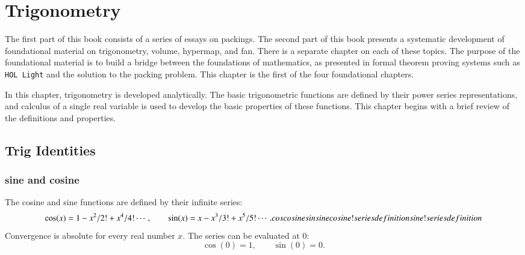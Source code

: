 
\chapter{Trigonometry}\label{part:trig}

The first part of this book consists of a series of essays
on packings.  The second part of this book presents
a systematic development of foundational material on
trigonometry, volume, hypermap, and fan.  There is a separate
chapter on each of these topics.  The purpose of the
foundational material is to build a bridge between
the foundations of mathematics, as presented in formal
theorem proving systems such as {\tt HOL Light} and the
solution to the packing problem.  
This chapter is the first of the four foundational chapters.


In this chapter, trigonometry is developed analytically.  The basic
trigonometric functions are defined by their power series
representations, and calculus of a single real variable is used to
develop the basic properties of these functions.  This chapter begins with a brief
review of the definitions and properties.

\section{Trig Identities}


\subsection{sine and cosine}

The cosine and sine functions are defined by their infinite series:%
%
    \begin{equation}\label{eqn:cos-def}\cos(x) = 1 - x^2/2! + x^4/4! \cdots,\qquad
  \sin(x) = x - x^3/3! + x^5/5! \cdots.
    \indy{Notation}{cos}
    \indy{Index}{cosine}
    \indy{Notation}{sin}
    \indy{Index}{sine}
    \indy{Index}{cosine!series definition}
    \indy{Index}{sine!series definition}
    \end{equation}
Convergence is absolute for every real number $x$.
The series can be evaluated at $0$:
    \begin{equation}\label{eqn:cos0}
    \cos(0) = 1,\qquad \sin(0) = 0.
    \end{equation}

